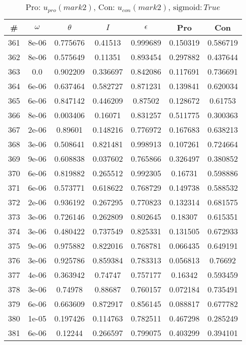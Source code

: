 \newpage
\begin{table}
\caption{Pro: $u_{pro} (mark 2)$, Con: $u_{con} (mark 2)$, $\mathrm{sigmoid}: True$}
\begin{tabular*}{\linewidth}{c|c|c|c|c|c|c}
\# & $\omega$ & $\theta$ & $I$ & $\epsilon$ & Pro & Con \\
\hline
361 & 8e-06 & 0.775676 & 0.41513 & 0.999689 & 0.150319 & 0.586719\\
362 & 8e-06 & 0.575649 & 0.11351 & 0.893454 & 0.297882 & 0.437644\\
363 & 0.0 & 0.902209 & 0.336697 & 0.842086 & 0.117691 & 0.736691\\
364 & 6e-06 & 0.637464 & 0.582727 & 0.871231 & 0.139841 & 0.620034\\
365 & 6e-06 & 0.847142 & 0.446209 & 0.87502 & 0.128672 & 0.61753\\
366 & 8e-06 & 0.003406 & 0.16071 & 0.831257 & 0.511775 & 0.300363\\
367 & 2e-06 & 0.89601 & 0.148216 & 0.776972 & 0.167683 & 0.638213\\
368 & 3e-06 & 0.508641 & 0.821481 & 0.998913 & 0.107261 & 0.724664\\
369 & 9e-06 & 0.608838 & 0.037602 & 0.765866 & 0.326497 & 0.380852\\
370 & 6e-06 & 0.819882 & 0.265512 & 0.992305 & 0.16731 & 0.598886\\
371 & 6e-06 & 0.573771 & 0.618622 & 0.768729 & 0.149738 & 0.588532\\
372 & 2e-06 & 0.936192 & 0.267295 & 0.770823 & 0.132314 & 0.681575\\
373 & 3e-06 & 0.726146 & 0.262809 & 0.802645 & 0.18307 & 0.615351\\
374 & 3e-06 & 0.480422 & 0.737549 & 0.825331 & 0.131505 & 0.672933\\
375 & 9e-06 & 0.975882 & 0.822016 & 0.768781 & 0.066435 & 0.649191\\
376 & 3e-06 & 0.925786 & 0.859384 & 0.783313 & 0.056813 & 0.76692\\
377 & 4e-06 & 0.363942 & 0.74747 & 0.757177 & 0.16342 & 0.593459\\
378 & 3e-06 & 0.74978 & 0.88687 & 0.760157 & 0.072184 & 0.735491\\
379 & 6e-06 & 0.663609 & 0.872917 & 0.856145 & 0.088817 & 0.677782\\
380 & 1e-05 & 0.197426 & 0.114763 & 0.782511 & 0.467298 & 0.285249\\
381 & 6e-06 & 0.12244 & 0.266597 & 0.799075 & 0.403299 & 0.394101\\

\end{tabular*}
\end{table}
